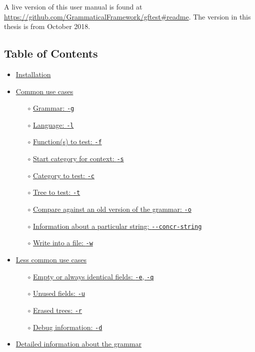 A live version of this user manual is found at \url{https://github.com/GrammaticalFramework/gftest#readme}. The version in this thesis is from October 2018.

\hypertarget{table-of-contents}{%
\subsection{Table of Contents}\label{table-of-contents}}

\begin{itemize}
\tightlist
\item
  \protect\hyperlink{installation}{Installation}

\item
  \protect\hyperlink{common-use-cases}{Common use cases}

  \begin{itemize}
  \tightlist
  \item[$\circ$]
    \protect\hyperlink{grammar--g}{Grammar: \texttt{-g}}
  \item[$\circ$]
    \protect\hyperlink{language--l}{Language: \texttt{-l}}
  \item[$\circ$]
    \protect\hyperlink{functions-to-test--f}{Function(s) to test:
    \texttt{-f}}
  \item[$\circ$]
    \protect\hyperlink{start-category-for-context--s}{Start category for
    context: \texttt{-s}}
  \item[$\circ$]
    \protect\hyperlink{category-to-test--c}{Category to test:
    \texttt{-c}}
  \item[$\circ$]
    \protect\hyperlink{tree-to-test--t}{Tree to test: \texttt{-t}}
  \item[$\circ$]
    \protect\hyperlink{compare-against-an-old-version-of-the-grammar--o}{Compare
    against an old version of the grammar: \texttt{-o}}
  \item[$\circ$]
    \protect\hyperlink{information-about-a-particular-string---concr-string}{Information
    about a particular string: \texttt{-\/-concr-string}}
  \item[$\circ$]
    \protect\hyperlink{write-into-a-file--w}{Write into a file:
    \texttt{-w}}
  \end{itemize}
\item
  \protect\hyperlink{less-common-use-cases}{Less common use cases}

  \begin{itemize}
  \tightlist
  \item[$\circ$]
    \protect\hyperlink{empty-or-always-identical-fields--e--q}{Empty or
    always identical fields: \texttt{-e}, \texttt{-q}}
  \item[$\circ$]
    \protect\hyperlink{unused-fields--u}{Unused fields: \texttt{-u}}
  \item[$\circ$]
    \protect\hyperlink{erased-trees--r}{Erased trees: \texttt{-r}}
  \item[$\circ$]
    \protect\hyperlink{debug-intormation--d}{Debug information:
    \texttt{-d}}
  \end{itemize}
\item
  \protect\hyperlink{detailed-information-about-the-grammar}{Detailed
  information about the grammar}


\end{itemize}
